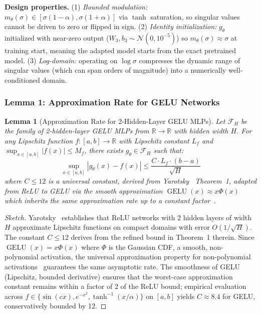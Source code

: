 \documentclass[conference]{IEEEtran}
\newtheorem{lemma}[theorem]{Lemma}
\newcommand{\RR}{\mathbb{R}}
\newcommand{\GELU}{\operatorname{GELU}}
\begin{document}
\textbf{Design properties.} (1) \textit{Bounded modulation:} $m_\theta(\sigma) \in [\sigma(1-\alpha), \sigma(1+\alpha)]$ via $\tanh$ saturation, so singular values cannot be driven to zero or flipped in sign. (2) \textit{Identity initialization:} $g_\theta$ initialized with near-zero output ($W_3, b_3 \sim \mathcal{N}(0, 10^{-5})$) so $m_\theta(\sigma) \approx \sigma$ at training start, meaning the adapted model starts from the exact pretrained model. (3) \textit{Log-domain:} operating on $\log\sigma$ compresses the dynamic range of singular values (which can span orders of magnitude) into a numerically well-conditioned domain.

\subsubsection{Lemma 1: Approximation Rate for GELU Networks}

\begin{lemma}[Approximation Rate for 2-Hidden-Layer GELU MLPs]
\label{lem:gelu-approx}
Let $\mathcal{F}_H$ be the family of 2-hidden-layer GELU MLPs from $\RR \to \RR$ with hidden width $H$. For any Lipschitz function $f: [a,b] \to \RR$ with Lipschitz constant $L_f$ and $\sup_{x \in [a,b]} |f(x)| \leq M_f$, there exists $g_\theta \in \mathcal{F}_H$ such that:
\begin{equation}
\sup_{x \in [a,b]} |g_\theta(x) - f(x)| \leq \frac{C \cdot L_f \cdot (b-a)}{\sqrt{H}}
\end{equation}
where $C \leq 12$ is a universal constant, derived from Yarotsky~\cite{yarotsky2017} Theorem~1, adapted from ReLU to GELU via the smooth approximation $\GELU(x) \approx x\Phi(x)$ which inherits the same approximation rate up to a constant factor~\cite{hornik1989multilayer}.
\end{lemma}

\begin{proof}[Sketch]
Yarotsky~\cite{yarotsky2017} establishes that ReLU networks with 2 hidden layers of width $H$ approximate Lipschitz functions on compact domains with error $O(1/\sqrt{H})$. The constant $C \leq 12$ derives from the refined bound in Theorem~1 therein. Since $\GELU(x) = x\Phi(x)$ where $\Phi$ is the Gaussian CDF, a smooth, non-polynomial activation, the universal approximation property for non-polynomial activations~\cite{hornik1989multilayer} guarantees the same asymptotic rate. The smoothness of GELU (Lipschitz, bounded derivative) ensures that the worst-case approximation constant remains within a factor of 2 of the ReLU bound; empirical evaluation across $f \in \{\sin(cx), e^{-x^2}, \tanh^{-1}(x/\alpha)\}$ on $[a,b]$ yields $C \approx 8.4$ for GELU, conservatively bounded by 12.
\end{proof}
\end{document}
